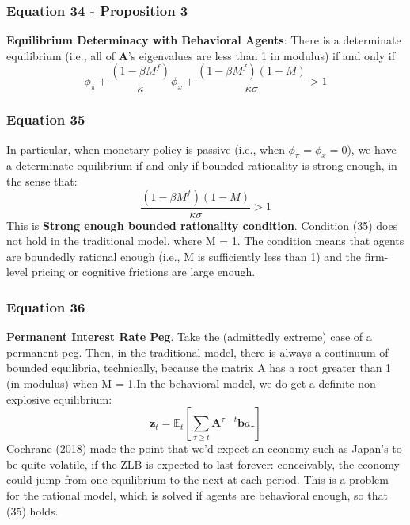 \documentclass{article}
\begin{document}
\subsubsection*{Equation 34 - Proposition 3}
\textbf{Equilibrium Determinacy with Behavioral Agents}: There is a determinate equilibrium (i.e., all of $\textbf{A}$’s eigenvalues are less than 1 in modulus) if and only if
\begin{equation}\tag{34}
    \phi_{\pi}+\frac{(1-\beta M^{f})}{\kappa}\phi_{x}+\frac{(1-\beta M^{f})(1-M)}{\kappa\sigma}>1
\end{equation}

\subsubsection*{Equation 35}
In particular, when monetary policy is passive (i.e., when $\phi_{\pi}=\phi_{x}=0$), we
have a determinate equilibrium if and only if bounded rationality is strong enough, in the sense that:
\begin{equation}\tag{35}
    \frac{(1-\beta M^{f})(1-M)}{\kappa\sigma}>1
\end{equation}
This is \textbf{Strong enough bounded rationality condition}. Condition (35) does not hold in the traditional model, where M = 1. The condition
means that agents are boundedly rational enough (i.e., M is sufficiently less than
1) and the firm-level pricing or cognitive frictions are large enough.

\subsubsection*{Equation 36}
\textbf{Permanent Interest Rate Peg}. Take the (admittedly extreme) case of a permanent peg. Then, in the traditional model, there is always a continuum of bounded equilibria, technically, because the matrix A has a root greater than 1 (in
modulus) when M = 1.In the behavioral model, we do get a definite non-explosive equilibrium:
\begin{equation}\tag{36}
    \textbf{z}_{t}=\mathbb{E}_{t}\left[\sum_{\tau \geq t}\textbf{A}^{\tau-t}\textbf{b}a_{\tau}\right]
\end{equation}
Cochrane (2018) made the point that we’d expect an economy such as Japan’s to be quite volatile, if the ZLB is expected to last forever: conceivably, the economy could jump from one equilibrium to the next at each period. This is a problem for the rational model, which is solved if agents are behavioral enough, so that (35) holds.
\end{document}

